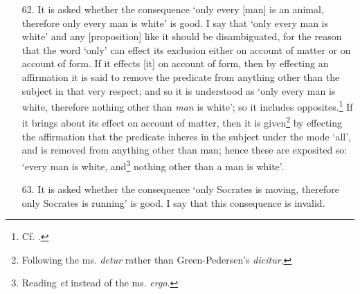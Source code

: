 \begin{enumerate}
\item[62.] It is asked whether the consequence `only every [man] is an animal, therefore only every man is white' is good. I say that `only every man is white' and any [proposition] like it should be disambiguated, for the reason that the word `only' can effect its exclusion either on account of matter or on account of form. If it effects [it] on account of form, then by effecting an affirmation it is said to remove the predicate from anything other than the subject in that very respect; and so it is understood as `only every man is white, therefore nothing other than \textit{man} is white'; so it includes opposites.\footnote{Cf. \cite[p. 120, par. 29-40]{Green-Pedersen1980b}.} If it brings about its effect on account of matter, then it is given\footnote{Following the ms. \textit{detur} rather than Green-Pedersen's \textit{dicitur}.} by effecting the affirmation that the predicate inheres in the subject under the mode `all', and is removed from anything other than man; hence these are exposited so: `every man is white, and\footnote{Reading \textit{et} instead of the ms. \textit{ergo}.} nothing other than a man is white'. 
\item[63.] It is asked whether the consequence `only Socrates is moving, therefore only Socrates is running' is good. I say that this consequence is invalid.


\end{enumerate}
